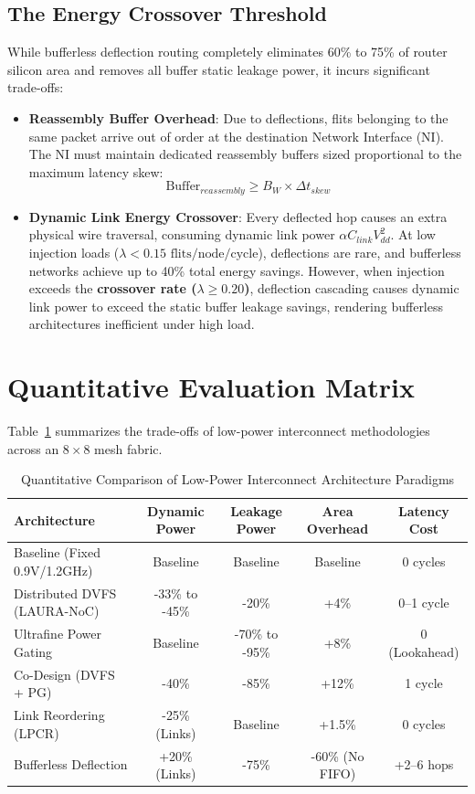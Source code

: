 \subsection{The Energy Crossover Threshold}
While bufferless deflection routing completely eliminates 60\% to 75\% of router silicon area and removes all buffer static leakage power, it incurs significant trade-offs:
\begin{itemize}
    \item \textbf{Reassembly Buffer Overhead}: Due to deflections, flits belonging to the same packet arrive out of order at the destination Network Interface (NI). The NI must maintain dedicated reassembly buffers sized proportional to the maximum latency skew:
    \begin{equation}
    \text{Buffer}_{reassembly} \ge B_W \times \Delta t_{skew}
    \end{equation}
    \item \textbf{Dynamic Link Energy Crossover}: Every deflected hop causes an extra physical wire traversal, consuming dynamic link power $\alpha C_{link} V_{dd}^2$. At low injection loads ($\lambda < 0.15\text{ flits/node/cycle}$), deflections are rare, and bufferless networks achieve up to 40\% total energy savings. However, when injection exceeds the \textbf{crossover rate ($\lambda \ge 0.20$)}, deflection cascading causes dynamic link power to exceed the static buffer leakage savings, rendering bufferless architectures inefficient under high load.
\end{itemize}

\section{Quantitative Evaluation Matrix}
\label{sec:ch6_matrix}

Table~\ref{tab:ch6_power_comparison} summarizes the trade-offs of low-power interconnect methodologies across an $8 \times 8$ mesh fabric.

\begin{table}[htbp]
\centering
\caption{Quantitative Comparison of Low-Power Interconnect Architecture Paradigms}
\label{tab:ch6_power_comparison}
\begin{tabular}{lcccc}
\toprule
\textbf{Architecture} & \textbf{Dynamic Power} & \textbf{Leakage Power} & \textbf{Area Overhead} & \textbf{Latency Cost} \\
\midrule
Baseline (Fixed 0.9V/1.2GHz) & Baseline & Baseline & Baseline & 0 cycles \\
Distributed DVFS (LAURA-NoC) & -33\% to -45\% & -20\% & +4\% & 0--1 cycle \\
Ultrafine Power Gating & Baseline & -70\% to -95\% & +8\% & 0 (Lookahead) \\
Co-Design (DVFS + PG) & -40\% & -85\% & +12\% & 1 cycle \\
Link Reordering (LPCR) & -25\% (Links) & Baseline & +1.5\% & 0 cycles \\
Bufferless Deflection & +20\% (Links) & -75\% & -60\% (No FIFO) & +2--6 hops \\
\bottomrule
\end{tabular}
\end{table}

